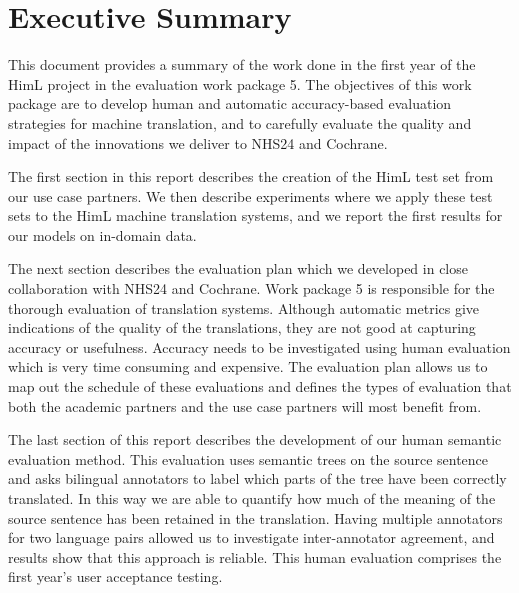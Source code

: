 \section{Executive Summary}

This document provides a summary of the work done in the first year of the HimL project in the
evaluation work package 5. 
The objectives of this work package are to develop human and automatic accuracy-based evaluation strategies 
for machine translation, and to carefully evaluate the quality and impact of the innovations we deliver to 
NHS24 and Cochrane.

The first section in this report describes the creation of the HimL test set from our use case partners.
We then describe experiments where we apply these test sets to the HimL  machine translation systems,
and we report the first results for our models on in-domain data. 
  
The next section describes the evaluation plan which we developed in close collaboration with NHS24 and Cochrane.
Work package 5 is responsible for the thorough evaluation of translation systems. 
Although automatic metrics give indications of the quality of the translations, they
are not good at capturing accuracy or usefulness. Accuracy needs to be investigated using human evaluation which is 
very time consuming and expensive. The
evaluation plan allows us to map out the schedule of these evaluations 
and defines the  types of evaluation that both the academic
partners and the use case partners will most benefit from. 
  
The last section of this report describes the development of our human semantic evaluation method. 
  This evaluation uses semantic trees on the source sentence and asks
 bilingual annotators to label 
which
parts of the tree have been correctly translated. 
 In this way we are able to quantify how much of the meaning of the source sentence has been
 retained 
in the translation.
Having multiple annotators for two language pairs allowed us to
investigate inter-annotator agreement, and results show that this approach is reliable. 
This human evaluation comprises the first year's user acceptance testing. 



